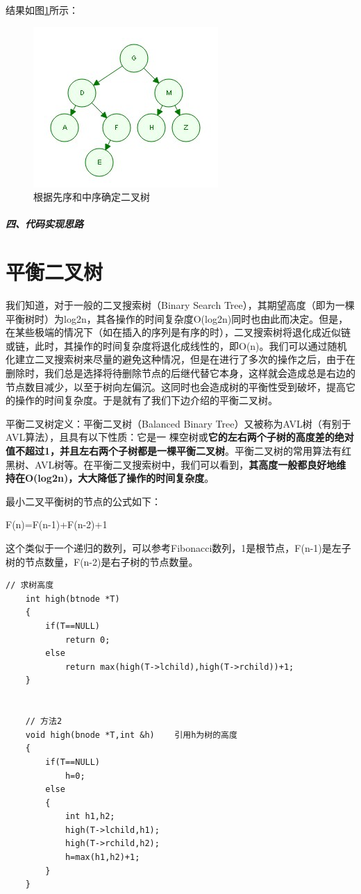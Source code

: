 \documentclass[UTF8,a4paper,12pt]{ctexbook}
\begin{document}
			结果如图\ref{mid_first}所示：
				\begin{figure}
					\centering
					\includegraphics[scale = 1]{Tree_Mid_First.jpg}
					\caption{根据先序和中序确定二叉树}
					\label{mid_first}
				\end{figure}
		
		\subparagraph{四、代码实现思路}


	\section{平衡二叉树}
		我们知道，对于一般的二叉搜索树（Binary Search Tree），其期望高度（即为一棵平衡树时）为log2n，其各操作的时间复杂度O(log2n)同时也由此而决定。但是，在某些极端的情况下（如在插入的序列是有序的时），二叉搜索树将退化成近似链或链，此时，其操作的时间复杂度将退化成线性的，即O(n)。我们可以通过随机化建立二叉搜索树来尽量的避免这种情况，但是在进行了多次的操作之后，由于在删除时，我们总是选择将待删除节点的后继代替它本身，这样就会造成总是右边的节点数目减少，以至于树向左偏沉。这同时也会造成树的平衡性受到破坏，提高它的操作的时间复杂度。于是就有了我们下边介绍的平衡二叉树。
		
		平衡二叉树定义：平衡二叉树（Balanced Binary Tree）又被称为AVL树（有别于AVL算法），且具有以下性质：它是一 棵空树或\textbf{它的左右两个子树的高度差的绝对值不超过1，并且左右两个子树都是一棵平衡二叉树}。平衡二叉树的常用算法有红黑树、AVL树等。在平衡二叉搜索树中，我们可以看到，\textbf{其高度一般都良好地维持在O(log2n)，大大降低了操作的时间复杂度}。
		
		最小二叉平衡树的节点的公式如下：
		
		F(n)=F(n-1)+F(n-2)+1
		
		这个类似于一个递归的数列，可以参考Fibonacci数列，1是根节点，F(n-1)是左子树的节点数量，F(n-2)是右子树的节点数量。
			\begin{lstlisting}[frame = L, xleftmargin = .07\textwidth]
	// 求树高度
	int high(btnode *T)  
	{  
		if(T==NULL)  
			return 0;  
		else  
			return max(high(T->lchild),high(T->rchild))+1;  
	}  
	
	
	// 方法2
	void high(bnode *T,int &h)    引用h为树的高度  
	{  
		if(T==NULL)  
			h=0;  
		else  
		{  
			int h1,h2;  
			high(T->lchild,h1);  
			high(T->rchild,h2);  
			h=max(h1,h2)+1;  
		}  
	}  
			\end{lstlisting}
			
\end{document}

